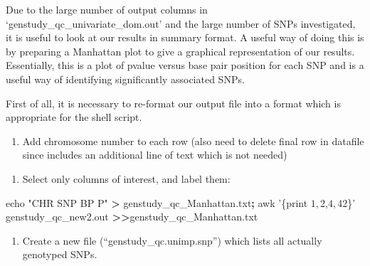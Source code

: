 \documentclass[]{book}
\newenvironment{Shaded}{\begin{snugshade}}{\end{snugshade}}
\newcommand{\KeywordTok}[1]{\textcolor[rgb]{0.13,0.29,0.53}{\textbf{#1}}}
\newcommand{\StringTok}[1]{\textcolor[rgb]{0.31,0.60,0.02}{#1}}
\newcommand{\FunctionTok}[1]{\textcolor[rgb]{0.00,0.00,0.00}{#1}}
\newcommand{\OperatorTok}[1]{\textcolor[rgb]{0.81,0.36,0.00}{\textbf{#1}}}
\newcommand{\BuiltInTok}[1]{#1}
\newcommand{\NormalTok}[1]{#1}
\providecommand{\tightlist}{%
  \setlength{\itemsep}{0pt}\setlength{\parskip}{0pt}}
\begin{document}
Due to the large number of output columns in
`genstudy\_qc\_univariate\_dom.out' and the large number of SNPs
investigated, it is useful to look at our results in summary format. A
useful way of doing this is by preparing a Manhattan plot to give a
graphical representation of our results. Essentially, this is a plot of
pvalue versus base pair position for each SNP and is a useful way of
identifying significantly associated SNPs.

First of all, it is necessary to re-format our output file into a format
which is appropriate for the shell script.

\begin{enumerate}
\def\labelenumi{\arabic{enumi}.}
\tightlist
\item
  Add chromosome number to each row (also need to delete final row in
  datafile since includes an additional line of text which is not
  needed)
\end{enumerate}

\begin{Shaded}
\end{Shaded}

\begin{enumerate}
\def\labelenumi{\arabic{enumi}.}
\setcounter{enumi}{1}
\tightlist
\item
  Select only columns of interest, and label them:
\end{enumerate}

\begin{Shaded}
\begin{Highlighting}[]
\BuiltInTok{echo} \StringTok{"CHR SNP BP P"} \OperatorTok{>}\NormalTok{ genstudy_qc_Manhattan.txt}\KeywordTok{;}
\FunctionTok{awk} \StringTok{'\{print $1,$2,$4,$42\}'}\NormalTok{ genstudy_qc_new2.out }\OperatorTok{>>}\NormalTok{genstudy_qc_Manhattan.txt}
\end{Highlighting}
\end{Shaded}

\begin{enumerate}
\def\labelenumi{\arabic{enumi}.}
\setcounter{enumi}{2}
\tightlist
\item
  Create a new file (``genstudy\_qc.unimp.snp'') which lists all
  actually genotyped SNPs.
\end{enumerate}
\end{document}
